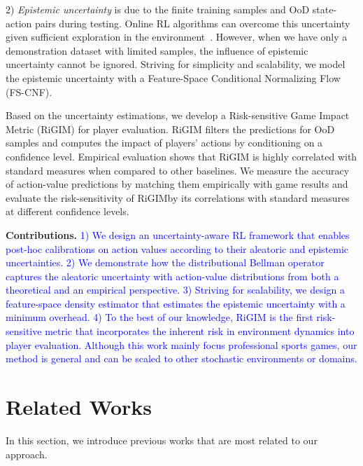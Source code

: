 \documentclass{article}
\newcommand{\sys}{RiGIM}
\newcommand{\system}{\sys\;}
\begin{document}
2) {\it Epistemic uncertainty} is due to the finite training samples and OoD state-action pairs during testing. Online RL algorithms can overcome this uncertainty given sufficient exploration in the environment~\cite{Mavrin2019DistributionalRL}. However, when we have only a demonstration dataset with limited samples, the influence of epistemic uncertainty cannot be ignored. Striving for simplicity and scalability, we model the epistemic uncertainty with a Feature-Space Conditional Normalizing Flow (FS-CNF).

Based on the uncertainty estimations, we develop a Risk-sensitive Game Impact Metric (RiGIM) for player evaluation. RiGIM filters the predictions for OoD samples and computes the impact of players' actions by conditioning on a confidence level.
Empirical evaluation shows that RiGIM is highly correlated with standard measures when compared to other baselines. 
We measure the accuracy of action-value predictions by matching them empirically with game results and evaluate the risk-sensitivity of \system by its correlations with standard measures at different confidence levels.

\noindent\textbf{Contributions.} \textcolor{blue}{1) We design an uncertainty-aware RL framework that enables post-hoc calibrations on action values according to their aleatoric and epistemic uncertainties. 2) We demonstrate how the distributional Bellman operator captures the aleatoric uncertainty with action-value distributions from both a theoretical and an empirical perspective. 3) Striving for scalability, we design a feature-space density estimator that estimates the epistemic uncertainty with a minimum overhead. 4) To the best of our knowledge, RiGIM is the first risk-sensitive metric that incorporates the inherent risk in environment dynamics into player evaluation. Although this work mainly focus professional sports games, our method is general and can be scaled to other stochastic environments or domains.}

\vspace{-0.05in}
\section{Related Works}
\vspace{-0.05in}
In this section, we introduce previous works that are most related to our approach.
\end{document}
